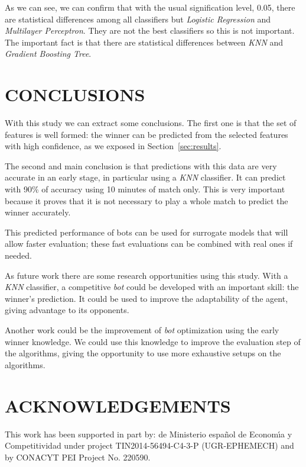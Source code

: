 \documentclass[a4paper,twoside]{article}\usepackage[]{graphicx}\usepackage[]{color}
\begin{document}
As we can see, we can confirm that with the usual signification level, 0.05,
there are statistical differences among all classifiers but \emph{Logistic
Regression} and \emph{Multilayer Perceptron}. They are not the best classifiers
so this is not important. The important fact is that there are statistical
differences between \emph{KNN} and \emph{Gradient Boosting Tree}.

\section{\uppercase{Conclusions}}
\label{sec:conclusions}

With this study we can extract some conclusions. The first one is that the set
of features is well formed: the winner can be predicted from the selected
features with high confidence, as we exposed in Section~\ref{sec:results}.

The second and main conclusion is that predictions with this data are very
accurate in an early stage, in particular using a \emph{KNN}
classifier. It can predict with 90\% of accuracy using 10 minutes of match only. %
This is very important because it proves that it is not necessary to play a
whole match to predict the winner accurately. %


This predicted performance of bots can be used for surrogate models \cite{zhou2007combining} that will allow faster evaluation; these fast evaluations can be combined with real ones if needed. 

As future work there are some research opportunities using this study. With a
\emph{KNN} classifier, a competitive \emph{bot} could be developed with an
important skill: the winner's prediction. It could be used to improve the
adaptability of the agent, giving advantage to its opponents.

Another work could be the improvement of \emph{bot} optimization using the early
winner knowledge. We could use this knowledge to improve the evaluation step of
the algorithms, giving the opportunity to use more exhaustive setups on the
algorithms.





\section*{\uppercase{Acknowledgements}}
\label{sec:acknowledgements}

This work has been supported in part by: de Ministerio espa\~{n}ol de
Econom\'{\i}a y Competitividad under project TIN2014-56494-C4-3-P
(UGR-EPHEMECH) and by CONACYT PEI Project No. 220590.

\vfill

{\small
}

\vfill
\end{document}
